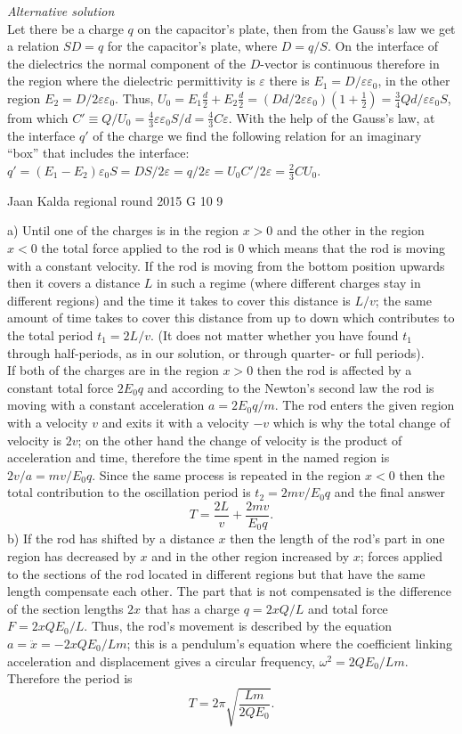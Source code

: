 \documentclass[11pt]{article}
\begin{document}
{\emph{Alternative solution}\\
Let there be a charge $q$ on the capacitor’s plate, then from the Gauss’s law we get a relation $SD=q$ for the capacitor’s plate, where $D=q/S$. On the interface of the dielectrics the normal component of the $D$-vector is continuous therefore in the region where the dielectric permittivity is $\varepsilon$ there is $E_1=D/\varepsilon\varepsilon_0$, in the other region $E_2=D/2\varepsilon\varepsilon_0$. Thus, $U_0=E_1\frac d2+E_2\frac d2=(Dd/2\varepsilon\varepsilon_0)(1+\frac 12)=\frac 34Qd/\varepsilon\varepsilon_0S$, from which $C'\equiv Q/U_0=\frac 43\varepsilon\varepsilon_0S/d=\frac 43C\varepsilon$. With the help of the Gauss’s law, at the interface $q'$ of the charge we find the following relation for an imaginary “box” that includes the interface: $q'=(E_1-E_2)\varepsilon_0S=DS/2\varepsilon=q/2\varepsilon=U_0C'/2\varepsilon=\frac 23CU_0$.
\fi
}

{Jaan Kalda} %
{regional round} %
{2015} %
{G 10} %
{9} %
{

\ifEngSolution
a) Until one of the charges is in the region $x>0$ and the other in the region $x<0$ the total force applied to the rod is 0 which means that the rod is moving with a constant velocity. If the rod is moving from the bottom position upwards then it covers a distance $L$ in such a regime (where different charges stay in different regions) and the time it takes to cover this distance is $L/v$; the same amount of time takes to cover this distance from up to down which contributes to the total period $t_1=2L/v$. (It does not matter whether you have found $t_1$ through half-periods, as in our solution, or through quarter- or full periods).\\
If both of the charges are in the region $x> 0$ then the rod is affected by a constant total force $2E_0q$ and according to the Newton’s second law the rod is moving with a constant acceleration $a=2E_0q/m$. The rod enters the given region with a velocity $v$ and exits it with a velocity $-v$ which is why the total change of velocity is $2v$; on the other hand the change of velocity is the product of acceleration and time, therefore the time spent in the named region is $2v/a=mv/E_0q$. Since the same process is repeated in the region $x<0$ then the total contribution to the oscillation period is $t_2=2mv/E_0q$ and the final answer 
\[ T=\frac{2L}v+\frac {2mv}{E_0q}. \] 
b) If the rod has shifted by a distance $x$ then the length of the rod’s part in one region has decreased by $x$ and in the other region increased by $x$; forces applied to the sections of the rod located in different regions but that have the same length compensate each other. The part that is not compensated is the difference of the section lengths $2x$ that has a charge $q=2xQ/L$ and total force $F=2xQE_0/L$. Thus, the rod’s movement is described by the equation $a=\ddot x= -2xQE_0/Lm$; this is a pendulum’s equation where the coefficient linking acceleration and displacement gives a circular frequency, $\omega^2=2QE_0/Lm$. Therefore the period is
\[ T=2\pi\sqrt{\frac{Lm}{2QE_0}}.\]
\fi
}
\end{document}
